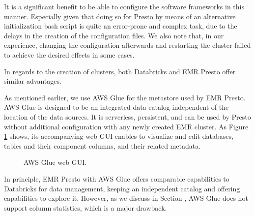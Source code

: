It is a significant benefit to be able to configure the software frameworks in this manner. Especially given that doing so for Presto by means of an alternative initialization bash script is quite an error-prone and complex task, due to the delays in the creation of the configuration files. We also note that, in our experience, changing the configuration afterwards and restarting the cluster failed to achieve the desired effects in some cases.

In regards to the creation of clusters, both Databricks and EMR Presto offer similar advantages.

As mentioned earlier, we use AWS Glue for the metastore used by EMR Presto. AWS Glue is designed to be an integrated data catalog independent of the location of the data sources. It is serverless, persistent, and can be used by Presto without additional configuration with any newly created EMR cluster. As Figure \ref{fig:awsGlueGUI} shows, its accompanying web GUI enables to visualize and edit databases, tables and their component columns, and their related metadata.

\begin{figure}
   \begin{center}
   \end{center}
   \caption{AWS Glue web GUI.}
   \label{fig:awsGlueGUI}
\end{figure}

In principle, EMR Presto with AWS Glue offers comparable capabilities to Databricks for data management, keeping an independent catalog and offering capabilities to explore it. However, as we discuss in Section \label{referenceResultsDataLoading}, AWS Glue does not support column statistics, which is a major drawback.

